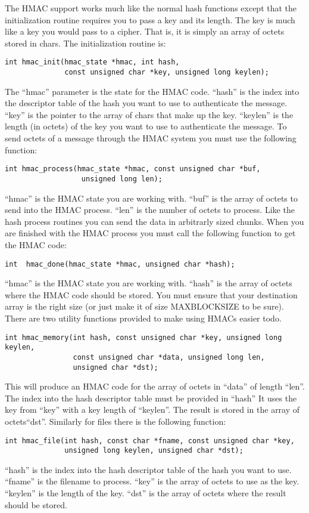 \documentclass{book}
\begin{document}
The HMAC support works much like the normal hash functions except that the initialization routine requires you to pass a key 
and its length.  The key is much like a key you would pass to a cipher.  That is, it is simply an array of octets stored in
chars.  The initialization routine is:
\begin{verbatim}
int hmac_init(hmac_state *hmac, int hash, 
              const unsigned char *key, unsigned long keylen);
\end{verbatim}
The ``hmac'' parameter is the state for the HMAC code.  ``hash'' is the index into the descriptor table of the hash you want
to use to authenticate the message.  ``key'' is the pointer to the array of chars that make up the key.  ``keylen'' is the
length (in octets) of the key you want to use to authenticate the message.  To send octets of a message through the HMAC system you must use the following function:
\begin{verbatim}
int hmac_process(hmac_state *hmac, const unsigned char *buf,
                  unsigned long len);
\end{verbatim}
``hmac'' is the HMAC state you are working with. ``buf'' is the array of octets to send into the HMAC process.  ``len'' is the
number of octets to process.  Like the hash process routines you can send the data in arbitrarly sized chunks. When you 
are finished with the HMAC process you must call the following function to get the HMAC code:
\begin{verbatim}
int  hmac_done(hmac_state *hmac, unsigned char *hash);
\end{verbatim}
``hmac'' is the HMAC state you are working with.  ``hash'' is the array of octets where the HMAC code should be stored.  You
must ensure that your destination array is the right size (or just make it of size MAXBLOCKSIZE to be sure).  There are 
two  utility functions provided to make using HMACs easier todo.
\begin{verbatim}
int hmac_memory(int hash, const unsigned char *key, unsigned long keylen,
                const unsigned char *data, unsigned long len, 
                unsigned char *dst);
\end{verbatim}
This will produce an HMAC code for the array of octets in ``data'' of length ``len''.  The index into the hash descriptor table must be provided in ``hash'' 
It uses the key from ``key'' with a key length of ``keylen''.  The result is stored in the array of octets``dst''.  
Similarly for files there is the following function:
\begin{verbatim}
int hmac_file(int hash, const char *fname, const unsigned char *key,
              unsigned long keylen, unsigned char *dst);
\end{verbatim}
``hash'' is the index into the hash descriptor table of the hash you want to use.  ``fname'' is the filename to process.  ``key''
is the array of octets to use as the key.  ``keylen'' is the length of the key.  ``dst'' is the array of octets where the result
should be stored.
\end{document}
